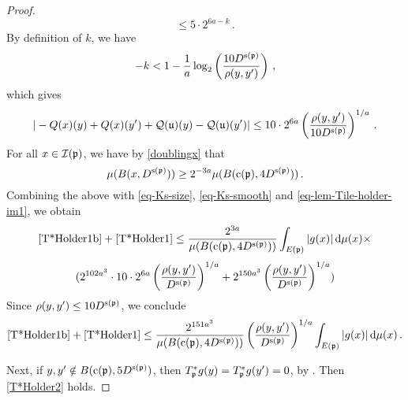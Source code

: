 \begin{proof}
        $$
            \le 5 \cdot 2^{6a - k}\,.
        $$
        By definition of $k$, we have
        $$
            -k < 1 - \frac{1}{a} \log_2\left(\frac{10 D^{{\mathrm{s}}({\mathfrak p})}}{\rho(y,y')}\right)\,,
        $$
        which gives
      \begin{equation}
            \label{eq-lem-Tile-holder-im1}
             |-{Q}(x)(y) + {Q}(x)(y') + {\mathcal{Q}}({\mathfrak u})(y) - {\mathcal{Q}}({\mathfrak u})(y')| \le 10 \cdot 2^{6a} \left(\frac{\rho(y,y')}{10 D^{{\mathrm{s}}({\mathfrak p})}}\right)^{1/a}\,.
        \end{equation}
        For all $x \in {\mathcal{I}}({\mathfrak p})$, we have by \eqref{doublingx} that
        $$
            \mu(B(x, D^{{\mathrm{s}}({\mathfrak p})})) \ge 2^{-3a} \mu(B({\mathrm{c}}({\mathfrak p}), 4D^{{\mathrm{s}}({\mathfrak p})}))\,.
        $$
        Combining the above with \eqref{eq-Ks-size}, \eqref{eq-Ks-smooth} and \eqref{eq-lem-Tile-holder-im1},
        we obtain
        $$
            \eqref{T*Holder1b}+\eqref{T*Holder1} \le \frac{2^{3a}}{\mu(B({\mathrm{c}}({\mathfrak p}), 4D^{{\mathrm{s}}({\mathfrak p})}))} \int_{E({\mathfrak p})}|g(x)| \, \mathrm{d}\mu(x) \times
        $$
        $$
            (2^{102a^3} \cdot 10 \cdot 2^{6a} \left(\frac{\rho(y,y')}{ D^{{\mathrm{s}}({\mathfrak p})}}\right)^{1/a} + 2^{150a^3} \left(\frac{\rho(y,y')}{D^{{\mathrm{s}}({\mathfrak p})}}\right)^{1/a})
        $$
        Since $\rho(y,y') \le 10 D^{{\mathrm{s}}({\mathfrak p})}$, we conclude
        $$
            \eqref{T*Holder1b}+\eqref{T*Holder1} \le \frac{2^{151a^3}}{\mu(B({\mathrm{c}}({\mathfrak p}), 4D^{{\mathrm{s}}({\mathfrak p})}))} \left(\frac{\rho(y,y')}{D^{{\mathrm{s}}({\mathfrak p})}}\right)^{1/a} \int_{E({\mathfrak p})}|g(x)| \, \mathrm{d}\mu(x)\,.
        $$

        Next, if $y,y' \notin B({\mathrm{c}}({\mathfrak p}), 5D^{{\mathrm{s}}({\mathfrak p})})$, then $T_{{\mathfrak p}}^*g(y) = T_{{\mathfrak p}}^*g(y') = 0$, by . Then \eqref{T*Holder2} holds.


\end{proof}
